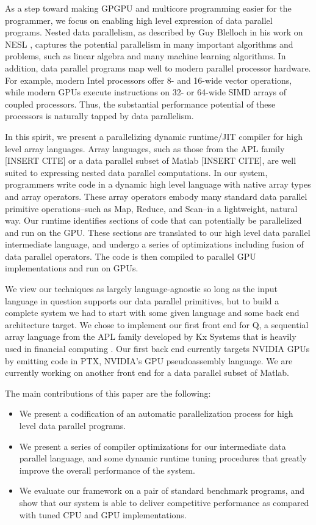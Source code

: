 \documentclass[preprint]{sigplanconf}
\begin{document}
As a step toward making GPGPU and multicore programming easier for the
programmer, we focus on enabling high level expression of data parallel
programs. Nested data parallelism, as described by Guy Blelloch in his work on
NESL \cite{Blel90}, captures the potential parallelism in many important
algorithms and problems, such as linear algebra and many machine learning
algorithms.  In addition, data parallel programs map well to modern
parallel processor hardware. For example, modern Intel processors offer 8- and
16-wide vector operations, while modern GPUs execute instructions on 32- or
64-wide SIMD arrays of coupled processors. Thus, the substantial
performance potential of these processors is naturally tapped by data
parallelism.

In this spirit, we present a parallelizing dynamic runtime/JIT compiler for
high level array languages.  Array languages, such as those from the APL family
[INSERT CITE] or a data parallel subset of Matlab [INSERT CITE], are well suited
to expressing nested data parallel computations. In our system, programmers
write code in a dynamic high level language with native array types and array
operators. These array operators embody many standard data parallel primitive
operations--such as Map, Reduce, and Scan--in a lightweight, natural way.  Our
runtime identifies sections of code that can potentially be parallelized and
run on the GPU.  These sections are translated to our high level data parallel
intermediate language, and undergo a series of optimizations including fusion
of data parallel operators.  The code is then compiled to parallel GPU
implementations and run on GPUs.

We view our techniques as largely language-agnostic so long as the input
language in question supports our data parallel primitives, but to build a
complete system we had to start with some given language and some back end
architecture target.  We chose to implement our first front end for Q, a
sequential array language from the APL family developed by Kx Systems that is
heavily used in financial computing \cite{Borr08}.  Our first back end currently
targets NVIDIA GPUs by emitting code in PTX, NVIDIA's GPU pseudoassembly
language.  We are currently working on another front end for a data parallel
subset of Matlab.

The main contributions of this paper are the following:

\begin{itemize}
\item We present a codification of an automatic parallelization process for
high level data parallel programs.
\item We present a series of compiler optimizations for our intermediate data
parallel language, and some dynamic runtime tuning procedures that greatly
improve the overall performance of the system.
\item We evaluate our framework on a pair of standard benchmark programs, and
show that our system is able to deliver competitive performance as compared
with tuned CPU and GPU implementations.
\end{itemize}
\end{document}
